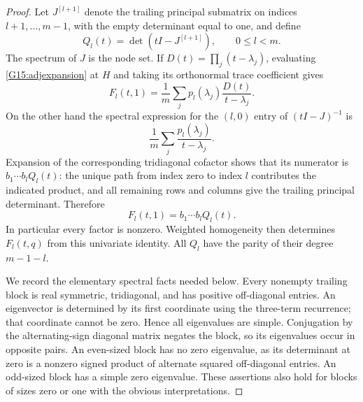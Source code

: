 \begin{proof}
Let $J^{[l+1]}$ denote the trailing principal submatrix
on indices $l+1,\ldots,m-1$, with the empty determinant
equal to one, and define
\[
 Q_l(t)=\det(tI-J^{[l+1]}),\qquad 0\leq l<m.
\]
The spectrum of $J$ is the node set. If
$D(t)=\prod_j(t-\lambda_j)$, evaluating
\eqref{G15:adjexpansion} at $H$ and taking its
orthonormal trace coefficient gives
\[
 F_l(t,1)=\frac1m\sum_jp_l(\lambda_j)
                         \frac{D(t)}{t-\lambda_j}.
\]
On the other hand the spectral expression for the
$(l,0)$ entry of $(tI-J)^{-1}$ is
\[
 \frac1m\sum_j\frac{p_l(\lambda_j)}{t-\lambda_j}.
\]
Expansion of the corresponding tridiagonal cofactor
shows that its numerator is
$b_1\cdots b_l Q_l(t)$: the unique path from index
zero to index $l$ contributes the indicated product,
and all remaining rows and columns give the trailing
principal determinant. Therefore
\begin{equation}\label{G15:jacobi}
 F_l(t,1)=b_1\cdots b_l Q_l(t).
\end{equation}
In particular every factor is nonzero. Weighted
homogeneity then determines $F_l(t,q)$ from this
univariate identity. All $Q_l$ have the parity of
their degree $m-1-l$.

We record the elementary spectral facts needed below.
Every nonempty trailing block is real symmetric,
tridiagonal, and has positive off-diagonal entries.
An eigenvector is determined by its first coordinate
using the three-term recurrence; that coordinate cannot
be zero. Hence all eigenvalues are simple. Conjugation
by the alternating-sign diagonal matrix negates the
block, so its eigenvalues occur in opposite pairs.
An even-sized block has no zero eigenvalue, as its
determinant at zero is a nonzero signed product of
alternate squared off-diagonal entries. An odd-sized
block has a simple zero eigenvalue. These assertions
also hold for blocks of sizes zero or one with the
obvious interpretations.


\end{proof}
